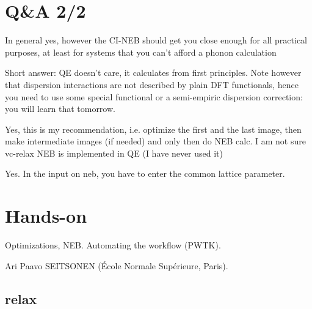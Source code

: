 \section{Q\&A 2/2}


In general yes, however the CI-NEB should get you close enough for all practical purposes, at least for systems that you can't afford a phonon calculation


Short answer: QE doesn't care, it calculates from first principles.
Note however that dispersion interactions are not described by plain DFT functionals, hence you need to use some special functional or a semi-empiric dispersion correction: you will learn that tomorrow.


Yes, this is my recommendation, i.e. optimize the first and the last image, then make intermediate images (if needed) and only then do NEB calc.
I am not sure vc-relax NEB is implemented in QE (I have never used it)


Yes. In the input on neb, you have to enter the common lattice parameter.

\section{Hands-on}

 Optimizations, NEB. Automating the workflow (PWTK).

 Ari Paavo SEITSONEN (École Normale Supérieure, Paris).

\subsection{relax}

